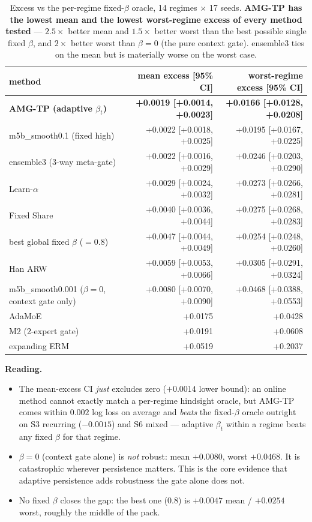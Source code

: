 \documentclass[11pt]{article}
\begin{document}
\begin{table}[H]
\centering
\small
\begin{tabular}{@{}lrr@{}}
\toprule
method & mean excess [95\% CI] & worst-regime excess [95\% CI] \\
\midrule
\textbf{AMG-TP (adaptive $\beta_t$)} & \textbf{+0.0019 [+0.0014, +0.0023]} & \textbf{+0.0166 [+0.0128, +0.0208]} \\
m5b\_smooth0.1 (fixed high) & +0.0022 [+0.0018, +0.0025] & +0.0195 [+0.0167, +0.0225] \\
ensemble3 (3-way meta-gate) & +0.0022 [+0.0016, +0.0029] & +0.0246 [+0.0203, +0.0290] \\
Learn-$\alpha$ & +0.0029 [+0.0024, +0.0032] & +0.0273 [+0.0266, +0.0281] \\
Fixed Share & +0.0040 [+0.0036, +0.0044] & +0.0275 [+0.0268, +0.0283] \\
best global fixed $\beta$ ($=0.8$) & +0.0047 [+0.0044, +0.0049] & +0.0254 [+0.0248, +0.0260] \\
Han ARW & +0.0059 [+0.0053, +0.0066] & +0.0305 [+0.0291, +0.0324] \\
m5b\_smooth0.001 ($\beta{=}0$, context gate only) & +0.0080 [+0.0070, +0.0090] & +0.0468 [+0.0388, +0.0553] \\
AdaMoE & +0.0175 & +0.0428 \\
M2 (2-expert gate) & +0.0191 & +0.0608 \\
expanding ERM & +0.0519 & +0.2037 \\
\bottomrule
\end{tabular}
\caption{Excess vs the per-regime fixed-$\beta$ oracle, 14 regimes $\times$ 17
seeds. \textbf{AMG-TP has the lowest mean and the lowest worst-regime excess of
every method tested} --- $2.5\times$ better mean and $1.5\times$ better worst
than the best possible single fixed $\beta$, and $2\times$ better worst than
$\beta{=}0$ (the pure context gate). ensemble3 ties on the mean but is
materially worse on the worst case.}
\label{tab:headline}
\end{table}

\noindent\textbf{Reading.}
\begin{itemize}[nosep]
\item The mean-excess CI \emph{just} excludes zero ($+0.0014$ lower bound): an
online method cannot exactly match a per-regime hindsight oracle, but AMG-TP
comes within $0.002$ log loss on average and \emph{beats} the fixed-$\beta$
oracle outright on S3 recurring ($-0.0015$) and S6 mixed --- adaptive $\beta_t$
within a regime beats any fixed $\beta$ for that regime.
\item $\beta{=}0$ (context gate alone) is \emph{not} robust: mean $+0.0080$,
worst $+0.0468$. It is catastrophic wherever persistence matters. This is the
core evidence that adaptive persistence adds robustness the gate alone does not.
\item No fixed $\beta$ closes the gap: the best one (0.8) is $+0.0047$ mean /
$+0.0254$ worst, roughly the middle of the pack.
\end{itemize}
\end{document}
